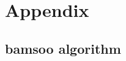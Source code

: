 \newcommand{\nocontentsline}[3]{}
\newcommand{\tocless}[2]{\bgroup\let\addcontentsline=\nocontentsline#1{#2}\egroup}


\newcommand{\SubAppendix}[1]{\tocless\section{#1}}

\appendix
\chapter{Appendix}

\SubAppendix{\acrfull{bamsoo} algorithm}
\label{ap:bamsoo_algo}


\SubAppendix{Internship offer}
\label{ap:internship}


